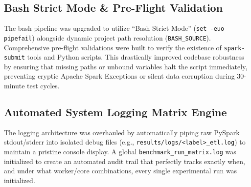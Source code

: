 \subsection{Bash Strict Mode \& Pre-Flight Validation}
The bash pipeline was upgraded to utilize ``Bash Strict Mode'' (\texttt{set -euo pipefail}) alongside dynamic project path resolution (\texttt{BASH\_SOURCE}). Comprehensive pre-flight validations were built to verify the existence of \texttt{spark-submit} tools and Python scripts. This drastically improved codebase robustness by ensuring that missing paths or unbound variables halt the script immediately, preventing cryptic Apache Spark Exceptions or silent data corruption during 30-minute test cycles.

\subsection{Automated System Logging Matrix Engine}
The logging architecture was overhauled by automatically piping raw PySpark stdout/stderr into isolated debug files (e.g., \texttt{results/logs/<label>\_etl.log}) to maintain a pristine console display. A global \texttt{benchmark\_run\_matrix.log} was initialized to create an automated audit trail that perfectly tracks exactly when, and under what worker/core combinations, every single experimental run was initialized.
